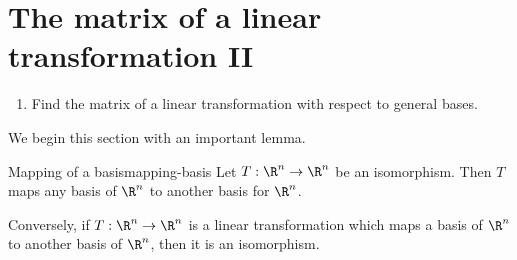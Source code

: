 \section{The matrix of a linear transformation II}


\begin{outcome}
  \begin{enumerate}
  \item Find the matrix of a linear transformation with respect to
    general bases.
  \end{enumerate}
\end{outcome}

We begin this section with an important lemma.

\begin{lemma}{Mapping of a basis}{mapping-basis}
Let $T: \R^n \to \R^n$ be an isomorphism.  Then $T$ maps any basis of
$\R^n$ to another basis for $\R^n$.

Conversely, if $T:
\R^n \to \R^n$ is a linear transformation which
maps a basis of $\R^n$ to another basis of $\R^n$,
then it is an isomorphism.
\end{lemma}

